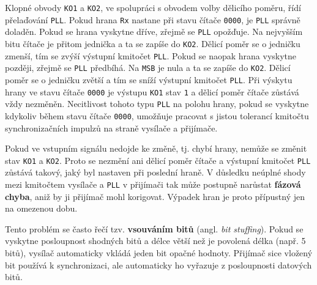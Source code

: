         Klopné obvody \texttt{KO1} a \texttt{KO2}, ve spolupráci s obvodem volby dělicího poměru, 
        řídí přelaďování \texttt{PLL}. Pokud hrana \texttt{Rx} nastane při stavu čítače 
        \texttt{0000}, je \texttt{PLL} správně doladěn. Pokud se hrana vyskytne dříve, zřejmě se 
        \texttt{PLL} opožďuje. Na nejvyšším bitu čítače je přitom jednička a ta se zapíše do 
        \texttt{KO2}. Dělicí poměr se o jedničku zmenší, tím se zvýší výstupní kmitočet 
        \texttt{PLL}. Pokud se naopak hrana vyskytne později, zřejmě se \texttt{PLL} předbíhá. Na 
        \texttt{MSB} je nula a ta se zapíše do \texttt{KO2}. Dělicí poměr se o jedničku zvětší a 
        tím se sníží výstupní kmitočet \texttt{PLL}. Při výskytu hrany ve stavu čítače 
        \texttt{0000} je výstupu \texttt{KO1} stav \texttt{1} a dělicí poměr čítače zůstává vždy 
        nezměněn. Necitlivost tohoto typu \texttt{PLL} na polohu hrany, pokud se vyskytne kdykoliv 
        během stavu čítače \texttt{0000}, umožňuje pracovat s jistou tolerancí kmitočtu 
        synchronizačních impulzů na straně vysílače a přijímače.
        
        Pokud ve vstupním signálu nedojde ke změně, tj. chybí hrany, nemůže se změnit stav 
        \texttt{KO1} a \texttt{KO2}. Proto se nezmění ani dělicí poměr čítače a výstupní kmitočet 
        \texttt{PLL} zůstává takový, jaký byl nastaven při poslední hraně. V důsledku neúplné shody 
        mezi kmitočtem vysílače a \texttt{PLL} v přijímači tak může postupně narůstat 
        \textbf{fázová chyba}, aniž by ji přijímač mohl korigovat. Výpadek hran je proto přípustný 
        jen na omezenou dobu.
        
        Tento problém se často řečí tzv. \textbf{vsouváním bitů} (angl. \emph{bit stuffing}). Pokud 
        se vyskytne posloupnost shodných bitů a délce větší než je povolená délka (např. 5 bitů), 
        vysílač automaticky vkládá jeden bit opačné hodnoty. Přijímač sice vložený bit používá k 
        synchronizaci, ale automaticky ho vyřazuje z posloupnosti datových bitů.
        
